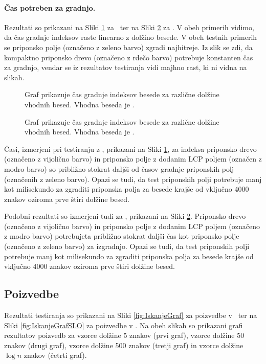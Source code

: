\paragraph{Čas potreben za gradnjo.} 

Rezultati so prikazani na Sliki \ref{fig:IzgradnjaGraf} za \DNK\ ter na Sliki \ref{fig:IzgradnjaGrafSLO} za \NK. V obeh primerih vidimo, da čas gradnje indeksov raste linearno z dolžino besede. V obeh testnih primerih se priponsko polje (označeno z zeleno barvo) zgradi najhitreje. Iz slik se zdi, da kompaktno priponsko drevo (označeno z rdečo barvo) potrebuje konstanten čas za gradnjo, vendar se iz rezultatov testiranja vidi majhno rast, ki ni vidna na slikah.

\begin{figure}[htb]
    \centering
    
    \caption{Graf prikazuje čas gradnje indeksov besede za različne dolžine vhodnih besed. Vhodna beseda je \DNK.} 
    \label{fig:IzgradnjaGraf}
\end{figure}

\begin{figure}[htb]
    \centering
    
    \caption{Graf prikazuje čas gradnje indeksov besede za različne dolžine vhodnih besed. Vhodna beseda je \NK.} 
    \label{fig:IzgradnjaGrafSLO}
\end{figure}

Časi, izmerjeni pri testiranju z \DNK, prikazani na Sliki \ref{fig:IzgradnjaGraf}, za indeksa priponsko drevo (označeno z vijolično barvo) in priponsko polje z dodanim LCP poljem (označen z modro barvo) so približno stokrat daljši od časov gradnje priponskih polj (označenih z zeleno barvo). Opazi se tudi, da test priponskih polji potrebuje manj kot milisekundo za zgraditi priponska polja za besede krajše od vključno 4000 znakov oziroma prve štiri dolžine besed.

Podobni rezultati so izmerjeni tudi za \NK, prikazani na Sliki \ref{fig:IzgradnjaGrafSLO}. Priponsko drevo (označeno z vijolično barvo) in priponsko polje z dodanim LCP poljem (označeno z modro barvo) potrebujeta približno stokrat daljši čas kot priponsko polje (označeno z zeleno barvo) za izgradnjo. Opazi se tudi, da test priponskih polji potrebuje manj kot milisekundo za zgraditi priponska polja za besede krajše od vključno 4000 znakov oziroma prve štiri dolžine besed.


\subsection{Poizvedbe}
Rezultati testiranja so prikazani na Sliki \ref{fig:IskanjeGraf} za poizvedbe v \DNK\ ter na Sliki \ref{fig:IskanjeGrafSLO} za poizvedbe v \NK. Na obeh slikah so prikazani grafi rezultatov poizvedb za vzorce dolžine 5 znakov (prvi graf), vzorce dolžine 50 znakov (drugi graf), vzorce dolžine 500 znakov (tretji graf) in vzorce dolžine $\log{n}$ znakov (četrti graf).

